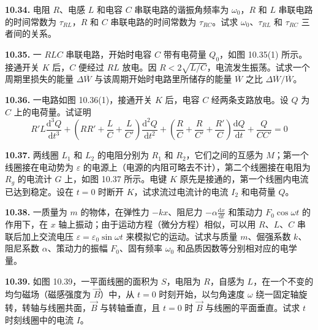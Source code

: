 \vfill
\newpage

\textbf{10.34.} 电阻 $R$、电感 $L$ 和电容 $C$ 串联电路的谐振角频率为 $\omega_0$，$R$ 和 $L$ 串联电路的时间常数为 $\tau_{RL}$，$R$ 和 $C$ 串联电路的时间常数为 $\tau_{RC}$。试求 $\omega_0$、$\tau_{RL}$ 和 $\tau_{RC}$ 三者间的关系。

\vfill
\newpage

\textbf{10.35.} 一 $RLC$ 串联电路，开始时电容 $C$ 带有电荷量 $Q_0$，如图 10.35(1) 所示。接通开关 $K$ 后，$C$ 便经过 $RL$ 放电。因 $R < 2\sqrt{L/C}$，电流发生振荡。试求一个周期里损失的能量 $\Delta\overline{W}$ 与该周期开始时电路里所储存的能量 $\overline{W}$ 之比 $\Delta\overline{W}/\overline{W}$。

\begin{center}
\end{center}

\vfill
\newpage

\textbf{10.36.} 一电路如图 10.36(1)，接通开关 $K$ 后，电容 $C$ 经两条支路放电。设 $Q$ 为 $C$ 上的电荷量。试证明
\[
R' L \frac{\mathrm{d}^3 Q}{\mathrm{d}t^3} + \left(R R' + \frac{L}{C} + \frac{L}{C'}\right) \frac{\mathrm{d}^2 Q}{\mathrm{d}t^2} + \left(\frac{R}{C} + \frac{R}{C'} + \frac{R'}{C}\right) \frac{\mathrm{d}Q}{\mathrm{d}t} + \frac{Q}{C C'} = 0
\]

\begin{center}
\end{center}

\vfill
\newpage

\textbf{10.37.} 两线圈 $L_1$ 和 $L_2$ 的电阻分别为 $R_1$ 和 $R_2$，它们之间的互感为 $M$；第一个线圈接在电动势为 $\varepsilon$ 的电源上（电源的内阻可略去不计），第二个线圈接在电阻为 $R_g$ 的电流计 $G$ 上，如图 10.37 所示。电键 $K$ 原先是接通的，第一个线圈内电流已达到稳定。设在 $t = 0$ 时断开 $K$，试求流过电流计的电流 $I_2$ 和电荷量 $Q$。

\begin{center}
\end{center}

\vfill
\newpage

\textbf{10.38.} 一质量为 $m$ 的物体，在弹性力 $-kx$、阻尼力 $\displaystyle -\alpha \frac{\mathrm{d}x}{\mathrm{d}t}$ 和策动力 $F_0 \cos \omega t$ 的作用下，在 $x$ 轴上振动；由于运动方程（微分方程）相似，可以用 $R$、$L$、$C$ 串联后加上交流电压 $\varepsilon = \varepsilon_0 \sin \omega t$ 来模拟它的运动。试求与质量 $m$、倔强系数 $k$、阻尼系数 $\alpha$、策动力的振幅 $F_0$、固有频率 $\omega_0$ 和品质因数等分别相对应的电学量。

\vfill
\newpage

\textbf{10.39.} 如图 10.39，一平面线圈的面积为 $S$，电阻为 $R$，自感为 $L$，在一个不变的均匀磁场（磁感强度为 $\vec{B}$）中，从 $t = 0$ 时刻开始，以匀角速度 $\omega$ 绕一固定轴旋转，转轴与线圈共面，$\vec{B}$ 与转轴垂直，且 $t = 0$ 时 $\vec{B}$ 与线圈的平面垂直。试求 $t$ 时刻线圈中的电流 $I$。

\begin{center}
\end{center}

\vfill
\newpage
